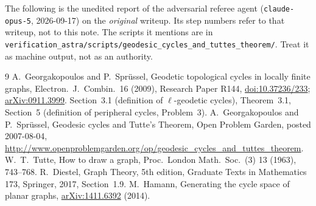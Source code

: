 \documentclass[11pt,a4paper]{article}
\theoremstyle{plain}
\theoremstyle{definition}
\theoremstyle{remark}
\begin{document}
\begin{tcolorbox}[colback=gray!8,colframe=gray!50,boxrule=0.4pt,arc=2pt]
\small The following is the unedited report of the adversarial referee agent (\texttt{claude-opus-5}, 2026-09-17) on the \emph{original} writeup. Its step numbers refer to that writeup, not to this note. The scripts it mentions are in \texttt{verification\_astra/scripts/geodesic\_cycles\_and\_tuttes\_theorem/}. Treat it as machine output, not as an authority.
\end{tcolorbox}



\begin{thebibliography}{9}
\small
\setlength{\itemsep}{2pt}
 A.~Georgakopoulos and P.~Sprüssel, Geodetic topological cycles in locally finite graphs, Electron.\ J.\ Combin.\ 16 (2009), Research Paper R144, \href{https://doi.org/10.37236/233}{doi:10.37236/233}; \href{https://arxiv.org/abs/0911.3999}{arXiv:0911.3999}. Section~3.1 (definition of $\ell$-geodetic cycles), Theorem~3.1, Section~5 (definition of peripheral cycles, Problem~3).
 A.~Georgakopoulos and P.~Sprüssel, Geodesic cycles and Tutte's Theorem, Open Problem Garden, posted 2007-08-04, \url{http://www.openproblemgarden.org/op/geodesic_cycles_and_tuttes_theorem}.
 W.~T.~Tutte, How to draw a graph, Proc.\ London Math.\ Soc.\ (3) 13 (1963), 743--768.
 R.~Diestel, Graph Theory, 5th edition, Graduate Texts in Mathematics 173, Springer, 2017, Section~1.9.
 M.~Hamann, Generating the cycle space of planar graphs, \href{https://arxiv.org/abs/1411.6392}{arXiv:1411.6392} (2014).
\end{thebibliography}
\end{document}

